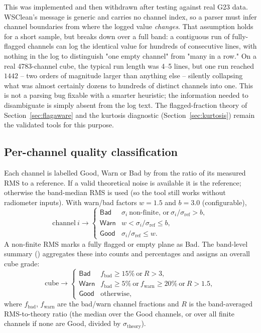 \documentclass[11pt,a4paper]{article}
\begin{document}
This was implemented and then withdrawn after testing against real G23 data.
WSClean's message is generic and carries no channel index, so a parser must
infer channel boundaries from where the logged value \emph{changes}. That
assumption holds for a short sample, but breaks down over a full band: a
contiguous run of fully-flagged channels can log the identical value for
hundreds of consecutive lines, with nothing in the log to distinguish "one
empty channel" from "many in a row." On a real 4783-channel cube, the typical
run length was 4--5 lines, but one run reached $1442$ -- two orders of
magnitude larger than anything else -- silently collapsing what was almost
certainly dozens to hundreds of distinct channels into one. This is not a
parsing bug fixable with a smarter heuristic; the information needed to
disambiguate is simply absent from the log text. The flagged-fraction theory
of Section~\ref{sec:flagaware} and the kurtosis diagnostic
(Section~\ref{sec:kurtosis}) remain the validated tools for this purpose.

\subsection{Per-channel quality classification}\label{sec:classify}
Each channel is labelled \textsf{Good}, \textsf{Warn} or \textsf{Bad} by
 from the ratio of its measured RMS to a reference.
If a valid theoretical noise is available it is the reference; otherwise the
band-median RMS is used (so the tool still works without radiometer inputs).
With warn/bad factors $w = 1.5$ and $b = 3.0$ (configurable),
\begin{equation}
  \text{channel}\ i \rightarrow
  \begin{cases}
    \textsf{Bad}  & \sigma_i\ \text{non-finite, or}\ \sigma_i/\sigma_{\mathrm{ref}} > b,\\
    \textsf{Warn} & w < \sigma_i/\sigma_{\mathrm{ref}} \le b,\\
    \textsf{Good} & \sigma_i/\sigma_{\mathrm{ref}} \le w.
  \end{cases}
\end{equation}
A non-finite RMS marks a fully flagged or empty plane as \textsf{Bad}. The
band-level summary () aggregates these into counts and
percentages and assigns an overall cube grade:
\begin{equation}
  \text{cube} \rightarrow
  \begin{cases}
    \textsf{Bad}  & f_{\mathrm{bad}} \ge 15\%\ \text{or}\ R > 3,\\
    \textsf{Warn} & f_{\mathrm{bad}} \ge 5\%\ \text{or}\ f_{\mathrm{warn}} \ge 20\%\ \text{or}\ R > 1.5,\\
    \textsf{Good} & \text{otherwise,}
  \end{cases}
\end{equation}
where $f_{\mathrm{bad}}$, $f_{\mathrm{warn}}$ are the bad/warn channel fractions
and $R$ is the band-averaged RMS-to-theory ratio (the median over the
\textsf{Good} channels, or over all finite channels if none are Good, divided by
$\sigma_{\mathrm{theory}}$).
\end{document}
